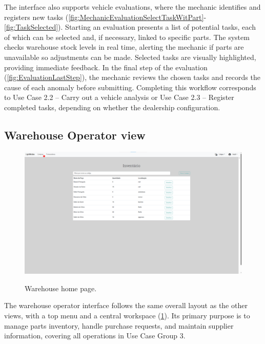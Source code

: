 The interface also supports vehicle evaluations, where the mechanic identifies and registers new tasks (\ref{fig:MechanicEvaluationSelectTaskWitPart}-\ref{fig:TaskSelected}). Starting an evaluation presents a list of potential tasks, each of which can be selected and, if necessary, linked to specific parts. The system checks warehouse stock levels in real time, alerting the mechanic if parts are unavailable so adjustments can be made. Selected tasks are visually highlighted, providing immediate feedback. In the final step of the evaluation (\ref{fig:EvaluationLastStep}), the mechanic reviews the chosen tasks and records the cause of each anomaly before submitting. Completing this workflow corresponds to Use Case 2.2 – Carry out a vehicle analysis or Use Case 2.3 – Register completed tasks, depending on whether the dealership configuration.


\subsection{Warehouse Operator view}


\begin{figure}[h]
  \caption{Warehouse home page.}
  \centering
  \includegraphics[width=\textwidth]{figs/Implementation/warehouse/homepage}
  \label{fig:warehouseHomepage}
\end{figure}



The warehouse operator interface follows the same overall layout as the other views, with a top menu and a central workspace (\ref{fig:warehouseHomepage}). Its primary purpose is to manage parts inventory, handle purchase requests, and maintain supplier information, covering all operations in Use Case Group 3.


